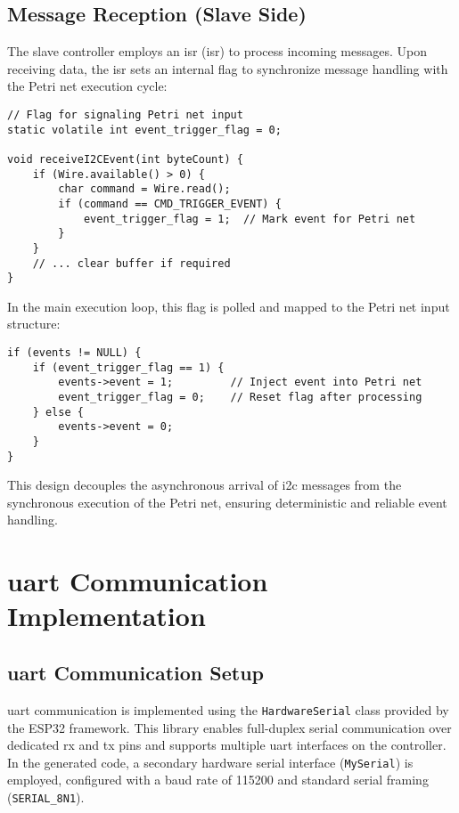 \subsection{Message Reception (Slave Side)}
The slave controller employs an \gls{isr} (\gls{isr}) to process incoming messages. Upon receiving data, the \gls{isr} sets an internal flag to synchronize message handling with the Petri net execution cycle:
\begin{verbatim}
// Flag for signaling Petri net input
static volatile int event_trigger_flag = 0;

void receiveI2CEvent(int byteCount) {
    if (Wire.available() > 0) {
        char command = Wire.read();
        if (command == CMD_TRIGGER_EVENT) {
            event_trigger_flag = 1;  // Mark event for Petri net
        }
    }
    // ... clear buffer if required
}
\end{verbatim}
In the main execution loop, this flag is polled and mapped to the Petri net input structure:
\begin{verbatim}
if (events != NULL) {
    if (event_trigger_flag == 1) {
        events->event = 1;         // Inject event into Petri net
        event_trigger_flag = 0;    // Reset flag after processing
    } else {
        events->event = 0;
    }
}
\end{verbatim}
This design decouples the asynchronous arrival of \gls{i2c} messages from the synchronous execution of the Petri net, ensuring deterministic and reliable event handling.



\section{\gls{uart} Communication Implementation}
\label{sec:uart_implementation}


\subsection{\gls{uart} Communication Setup}
\gls{uart} communication is implemented using the \texttt{HardwareSerial} class provided by the ESP32 framework. This library enables full-duplex serial communication over dedicated \gls{rx} and \gls{tx} pins and supports multiple \gls{uart} interfaces on the controller. In the generated code, a secondary hardware serial interface (\texttt{MySerial}) is employed, configured with a baud rate of 115200 and standard serial framing (\texttt{SERIAL\_8N1}).

